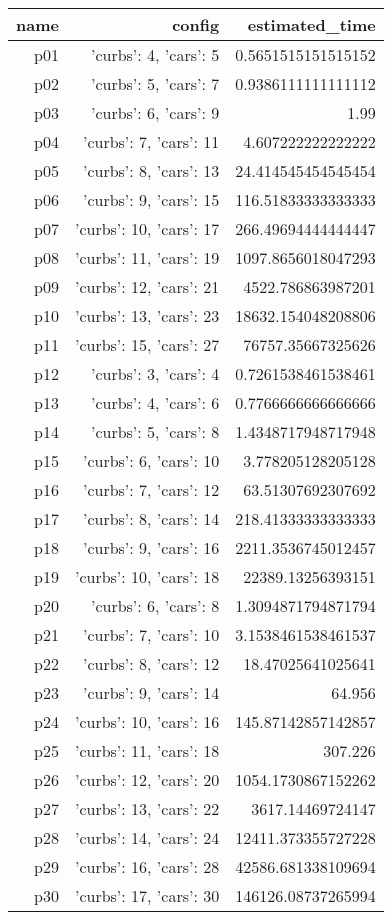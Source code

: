 \documentclass{article}
\begin{document}
                            \begin{center}
                            \scriptsize
                            \begin{tabular}{r|r|r}
                            name & config & estimated\_time\\\midrule
                              p01&{'curbs': 4, 'cars': 5}&0.5651515151515152\\
  p02&{'curbs': 5, 'cars': 7}&0.9386111111111112\\
  p03&{'curbs': 6, 'cars': 9}&1.99\\
  p04&{'curbs': 7, 'cars': 11}&4.607222222222222\\
  p05&{'curbs': 8, 'cars': 13}&24.414545454545454\\
  p06&{'curbs': 9, 'cars': 15}&116.51833333333333\\
  p07&{'curbs': 10, 'cars': 17}&266.49694444444447\\
  p08&{'curbs': 11, 'cars': 19}&1097.8656018047293\\
  p09&{'curbs': 12, 'cars': 21}&4522.786863987201\\
  p10&{'curbs': 13, 'cars': 23}&18632.154048208806\\
  p11&{'curbs': 15, 'cars': 27}&76757.35667325626\\
  p12&{'curbs': 3, 'cars': 4}&0.7261538461538461\\
  p13&{'curbs': 4, 'cars': 6}&0.7766666666666666\\
  p14&{'curbs': 5, 'cars': 8}&1.4348717948717948\\
  p15&{'curbs': 6, 'cars': 10}&3.778205128205128\\
  p16&{'curbs': 7, 'cars': 12}&63.51307692307692\\
  p17&{'curbs': 8, 'cars': 14}&218.41333333333333\\
  p18&{'curbs': 9, 'cars': 16}&2211.3536745012457\\
  p19&{'curbs': 10, 'cars': 18}&22389.13256393151\\
  p20&{'curbs': 6, 'cars': 8}&1.3094871794871794\\
  p21&{'curbs': 7, 'cars': 10}&3.1538461538461537\\
  p22&{'curbs': 8, 'cars': 12}&18.47025641025641\\
  p23&{'curbs': 9, 'cars': 14}&64.956\\
  p24&{'curbs': 10, 'cars': 16}&145.87142857142857\\
  p25&{'curbs': 11, 'cars': 18}&307.226\\
  p26&{'curbs': 12, 'cars': 20}&1054.1730867152262\\
  p27&{'curbs': 13, 'cars': 22}&3617.14469724147\\
  p28&{'curbs': 14, 'cars': 24}&12411.373355727228\\
  p29&{'curbs': 16, 'cars': 28}&42586.681338109694\\
  p30&{'curbs': 17, 'cars': 30}&146126.08737265994
                            \end{tabular}
                            \end{center}
                    
\end{document}
